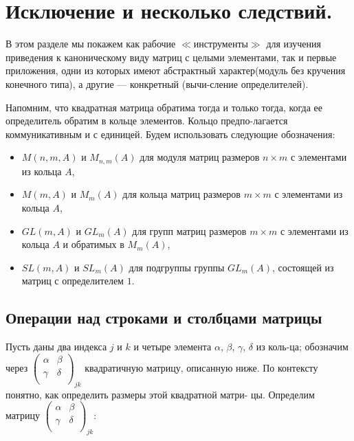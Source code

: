 \section{Исключение и несколько следствий.}
В этом разделе мы покажем как рабочие $\ll$инструменты$\gg$ для изучения \linebreak приведения к каноническому виду матриц с целыми элементами, так \linebreak и первые приложения, одни из которых имеют абстрактный характер\linebreak (модуль без кручения конечного типа), а другие --- конкретный (вычи-\linebreak сление определителей). 
  
  Напомним, что квадратная матрица обратима тогда и только тогда, \linebreak когда ее определитель обратим в кольце элементов. Кольцо предпо-\linebreak лагается коммуникативным и с единицей. Будем использовать следующие обозначения:
\begin{itemize}
  \item $M(n, m, A)$ и $M_{n,m}(A)$ для модуля матриц размеров $n\times m$ с
  элементами из кольца $A$,
  \item  $M(m,A)$ и $M_m(A)$ для кольца матриц размеров $m\times m$ с
  элементами  из кольца $A$,
  \item  $GL(m,A)$ и $GL_m(A)$ для групп матриц размеров $m\times m$ с 
  элементами из кольца $A$ и обратимых в $M_m(A)$,
  \item  $SL(m,A)$ и $SL_m(A)$ для подгруппы группы $GL_m(A)$, состоящей 
  из матриц с определителем $1$.
  \end{itemize}
\subsection{Операции над строками и столбцами матрицы}

Пусть даны два индекса $j$ и $k$ и четыре элемента $\alpha$, $\beta$, $\gamma$, $\delta$ из коль-\linebreak ца; обозначим через ${\left( \begin{array}{ccc}
\alpha & \beta \\
\gamma & \delta \\
\end{array} \right)}_{jk}$ квадратичную матрицу, описанную ниже. По контексту понятно, как определить размеры этой квадратной матри- \linebreak цы. Определим матрицу 
${\left( \begin{array}{ccc}
\alpha & \beta \\
\gamma & \delta \\
\end{array} \right)}_{jk}$:

